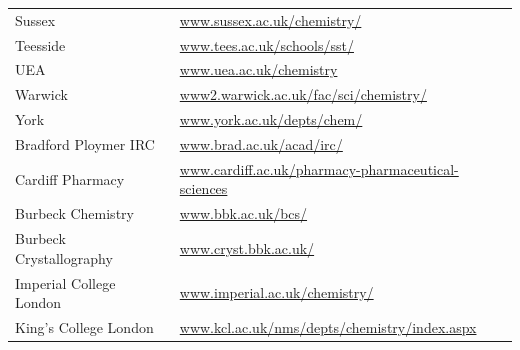 \begin{table}[H]
\begin{tabular}{||p{4cm}|Y||}
 \footnotesize{Sussex                            } & \footnotesize{\url{www.sussex.ac.uk/chemistry/}}                                                                                                   \\
 \footnotesize{Teesside                         }  & \footnotesize{\url{www.tees.ac.uk/schools/sst/}}                                                                                                   \\
 \footnotesize{UEA                             }   & \footnotesize{\url{www.uea.ac.uk/chemistry}}                                                                                                       \\
 \footnotesize{Warwick                        }    & \footnotesize{\url{www2.warwick.ac.uk/fac/sci/chemistry/}}                                                                                         \\
 \footnotesize{York                          }     & \footnotesize{\url{www.york.ac.uk/depts/chem/}}                                                                                                   \\ 
 \footnotesize{Bradford Ploymer IRC         }      & \footnotesize{\url{www.brad.ac.uk/acad/irc/}}                                                                                                      \\
 \footnotesize{Cardiff Pharmacy            }       & \footnotesize{\url{www.cardiff.ac.uk/pharmacy-pharmaceutical-sciences}}                                                                            \\
 \footnotesize{Burbeck Chemistry          }        & \footnotesize{\url{www.bbk.ac.uk/bcs/}}                                                                                                            \\
 \footnotesize{Burbeck Crystallography   }         & \footnotesize{\url{www.cryst.bbk.ac.uk/}}                                                                                                          \\
 \footnotesize{Imperial College London  }          & \footnotesize{\url{www.imperial.ac.uk/chemistry/}}                                                                                                 \\
 \footnotesize{King's College London   }          & \footnotesize{\url{www.kcl.ac.uk/nms/depts/chemistry/index.aspx}}                                                                                  \\

\end{tabular}
\end{table}
